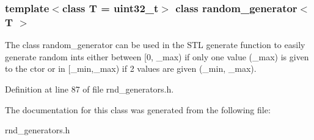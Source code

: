 \subsubsection*{template$<$class T = uint32\_\-t$>$ class random\_\-generator$<$ T $>$}

The class random\_\-generator can be used in the STL generate function to easily generate random ints either between [0, \_\-max) if only one value (\_\-max) is given to the ctor or in [\_\-min,\_\-max) if 2 values are given (\_\-min, \_\-max). 



Definition at line 87 of file rnd\_\-generators.h.

The documentation for this class was generated from the following file:\begin{CompactItemize}
\item 
rnd\_\-generators.h\end{CompactItemize}
